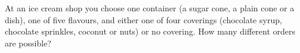 At an ice cream shop you choose one container (a sugar cone, a plain cone or a dish), one of five flavours, and either one of four coverings (chocolate syrup, chocolate sprinkles, coconut or nuts) or no covering. How many different orders are possible?
